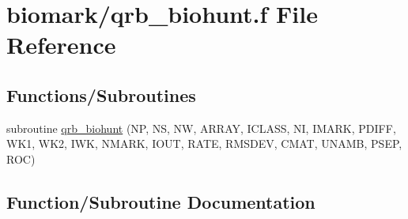 \hypertarget{qrb__biohunt_8f}{}\section{biomark/qrb\+\_\+biohunt.f File Reference}
\label{qrb__biohunt_8f}
\subsection*{Functions/\+Subroutines}
\begin{DoxyCompactItemize}
\item 
subroutine \hyperlink{qrb__biohunt_8f_a5633a0aecaa5db3e7d40db7c1306e4a2}{qrb\+\_\+biohunt} (NP, NS, NW, A\+R\+R\+AY, I\+C\+L\+A\+SS, NI, I\+M\+A\+RK, P\+D\+I\+FF, W\+K1, W\+K2, I\+WK, N\+M\+A\+RK, I\+O\+UT, R\+A\+TE, R\+M\+S\+D\+EV, C\+M\+AT, U\+N\+A\+MB, P\+S\+EP, R\+OC)
\end{DoxyCompactItemize}


\subsection{Function/\+Subroutine Documentation}
\mbox{\label{qrb__biohunt_8f_a5633a0aecaa5db3e7d40db7c1306e4a2}} 
